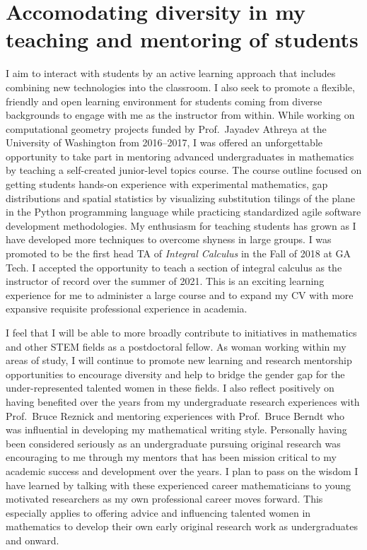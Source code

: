 \documentclass[10pt,reqno,letterpaper]{article}
\theoremstyle{plain}
\numberwithin{theorem}{section}
\theoremstyle{definition}
\begin{document}
\section{Accomodating diversity in my teaching and mentoring of students}

I aim to interact with students by an active learning approach 
that includes combining new technologies into the classroom. 
I also seek to promote a flexible, friendly and open learning environment for 
students coming from diverse backgrounds to engage with me as the instructor from within.
While working on computational geometry projects funded by 
Prof.~Jayadev Athreya at the University of Washington from 2016--2017, 
I was offered an unforgettable opportunity to take part in mentoring advanced undergraduates 
in mathematics by teaching a self-created junior-level topics course. The course outline 
focused on getting students hands-on experience with experimental mathematics, 
gap distributions and spatial statistics by visualizing substitution tilings of the 
plane in the Python programming language while practicing 
standardized agile software development methodologies. 
My enthusiasm for teaching students 
has grown as I have developed more techniques to overcome shyness in large groups. 
I was promoted to be the first head TA of \emph{Integral Calculus} in the Fall of 2018 at GA Tech. 
I accepted the opportunity to teach a section of integral calculus 
as the instructor of record over the summer of 2021. 
This is an exciting learning experience for me to administer a large course 
and to expand my CV with more expansive requisite professional experience in academia. 

I feel that I will be able to more broadly contribute 
to initiatives in mathematics and other STEM fields as a 
postdoctoral fellow. 
As woman working within my areas of study, I will continue to promote new learning 
and research mentorship opportunities to encourage diversity and help to bridge the gender 
gap for the under-represented talented women in these fields.
I also reflect positively on having benefited over the years from my undergraduate research experiences 
with Prof.~Bruce Reznick and 
mentoring experiences with Prof.~Bruce Berndt who was influential in 
developing my mathematical writing style.
Personally having been considered seriously as an 
undergraduate pursuing original research was encouraging to me through 
my mentors that has been mission critical to my academic success and development over the years. 
I plan to pass on the wisdom I have learned
by talking with these experienced career mathematicians to young motivated researchers as my 
own professional career moves forward. This especially applies to offering advice and 
influencing talented women in mathematics to develop their own early original 
research work as undergraduates and onward. 
\end{document}
